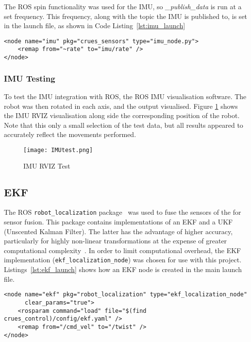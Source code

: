 The ROS spin functionality was used for the IMU, so
\textit{\_publish\_data} is run at a set
frequency. This frequency, along with the topic the
IMU is published to, is set in the launch file, as
shown in Code Listing~\ref{lst:imu_launch}

\begin{lstlisting}[caption={\texttt{\_publish\_data} in \texttt{imu\_node}}, label={lst:imu_message}, style=xml]
<node name="imu" pkg="crues_sensors" type="imu_node.py">
    <remap from="~rate" to="imu/rate" />
</node>
\end{lstlisting}

\subsubsection{IMU Testing}\label{soft/odometry/imu/test}

To test the IMU integration with ROS, the ROS IMU visualisation software. The robot was then rotated in each axis, and the output visualised.  Figure \ref{fig:imu_test} shows the IMU RVIZ visualisation along side the corresponding position of the robot. Note that this only a small selection of the test data, but all results appeared to accurately reflect the movements performed.

\begin{figure}[!ht]
	\centering
	\texttt{[image: IMUtest.png]}
	\caption{IMU RVIZ Test}\label{fig:imu_test}
\end{figure}

\subsection{EKF}\label{soft/odometry/ekf}

The ROS \verb|robot_localization| package~\cite{RosRobotLocalization} was used
to fuse the sensors of the for sensor fusion. This package contains implementations of
an EKF and a UKF (Unscented Kalman Filter). The latter has the advantage of higher
accuracy, particularly for highly non-linear transformations at the expense of
greater computational complexity~\cite{wan_unscented_2000}. In order to limit
computational overhead, the EKF implementation (\verb|ekf_localization_node|) was
chosen for use with this project. Listings~\ref{lst:ekf_launch} shows how an EKF
node is created in the main launch file.

\begin{lstlisting}[caption={EKF node in ROS launch file}, label={lst:ekf_launch}, style=xml]
<node name="ekf" pkg="robot_localization" type="ekf_localization_node"
      clear_params="true">
    <rosparam command="load" file="$(find crues_control)/config/ekf.yaml" />
    <remap from="/cmd_vel" to="/twist" />
</node>
\end{lstlisting}

